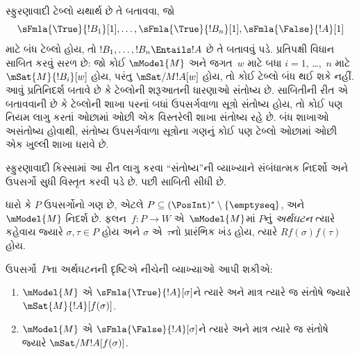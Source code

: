 \begingroup
\makeatletter{}\makeatother


\label{guunit:OLP-0515}


\begin{explain}
  સ્ફુરણાવાદી ટેબ્લો યથાર્થ છે તે બતાવવા,
  જો
  \[
  \sFmla{\True}{!B_1}[1], \dots, \sFmla{\True}{!B_n}[1], \sFmla{\False}{!A}[1]
  \]
  માટે બંધ ટેબ્લો હોય, તો
  $!B_1, \dots, !B_n \Entails !A$ છે તે બતાવવું પડે.
  પ્રતિપક્ષી વિધાન સાબિત કરવું સરળ છે: જો કોઈ
  $\mModel{M}$ અને જગત~$w$ માટે બધા $i=1$,
  \dots,~$n$ માટે $\mSat{M}{!B_i}[w]$ હોય,
  પરંતુ $\mSat/{M}{!A}[w]$ હોય, તો કોઈ
  ટેબ્લો બંધ થઈ શકે નહીં.
  આવું પ્રતિનિદર્શ બતાવે છે કે ટેબ્લોની
  શરૂઆતની ધારણાઓ સંતોષ્ય છે. સાબિતીની રીત એ
  બતાવવાની છે કે ટેબ્લોની શાખા પરનાં બધાં
  ઉપસર્ગવાળા સૂત્રો સંતોષ્ય હોય, તો કોઈ પણ
  નિયમ લાગુ કરતાં ઓછામાં ઓછી એક વિસ્તરેલી શાખા
  સંતોષ્ય રહે છે. બંધ શાખાઓ અસંતોષ્ય હોવાથી,
  સંતોષ્ય ઉપસર્ગવાળા સૂત્રોના ગણનું કોઈ પણ
  ટેબ્લો ઓછામાં ઓછી એક ખુલ્લી શાખા ધરાવે છે.

  સ્ફુરણાવાદી કિસ્સામાં આ રીત લાગુ કરવા
  ``સંતોષ્ય''ની વ્યાખ્યાને સંબંધાત્મક નિદર્શો અને
  ઉપસર્ગો સુધી વિસ્તૃત કરવી પડે છે. પછી સાબિતી
  સીધી છે.
\end{explain}

\begin{defn}
  ધારો કે $P$ ઉપસર્ગોનો ગણ છે, એટલે
  $P \subseteq (\PosInt)^* \setminus \{\emptyseq\}$,
  અને $\mModel{M}$ નિદર્શ છે.
  ફલન~$f\colon P \to W$ એ~$\mModel{M}$માં
  $P$નું \emph{અર્થઘટન} ત્યારે કહેવાય જ્યારે
  $\sigma,\tau\in P$ હોય અને $\sigma$ એ~$\tau$નો
  પ્રારંભિક ખંડ હોય, ત્યારે $Rf(\sigma)f(\tau)$ હોય.

  ઉપસર્ગો~$P$ના અર્થઘટનની દૃષ્ટિએ નીચેની
  વ્યાખ્યાઓ આપી શકીએ:
  \begin{enumerate}
  \item $\mModel{M}$ એ $\sFmla{\True}{!A}[\sigma]$ને
    ત્યારે અને માત્ર ત્યારે જ સંતોષે જ્યારે
    $\mSat{M}{!A}[f(\sigma)]$.
  \item $\mModel{M}$ એ $\sFmla{\False}{!A}[\sigma]$ને
    ત્યારે અને માત્ર ત્યારે જ સંતોષે જ્યારે
    $\mSat/{M}{!A}[f(\sigma)]$.
  \end{enumerate}
\end{defn}

